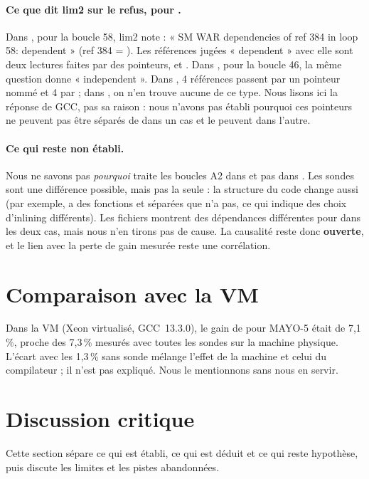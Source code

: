 \paragraph{Ce que dit lim2 sur le refus, pour .} \F{} Dans , pour la boucle 58, lim2 note : « SM WAR dependencies of ref 384 in loop 58: dependent » (ref 384 = ). Les références jugées « dependent » avec elle sont deux lectures  faites par des pointeurs,  et . Dans , pour la boucle 46, la même question donne « independent ». Dans , 4 références passent par un pointeur nommé  et 4 par ; dans , on n'en trouve aucune de ce type. Nous lisons ici la réponse de GCC, pas sa raison : nous n'avons pas établi pourquoi ces pointeurs ne peuvent pas être séparés de  dans un cas et le peuvent dans l'autre.

\paragraph{Ce qui reste non établi.} Nous ne savons pas \emph{pourquoi}  traite les boucles A2 dans  et pas dans . Les sondes sont une différence possible, mais pas la seule : la structure du code change aussi (par exemple,  a des fonctions  et  séparées que  n'a pas, ce qui indique des choix d'inlining différents). Les fichiers montrent des dépendances différentes pour  dans les deux cas, mais nous n'en tirons pas de cause. La causalité reste donc \textbf{ouverte}, et le lien avec la perte de gain mesurée reste une corrélation.

\section{Comparaison avec la VM}
\F{} Dans la VM (Xeon virtualisé, GCC~13.3.0), le gain de  pour MAYO-5 était de 7,1\,\%, proche des 7,3\,\% mesurés avec toutes les sondes sur la machine physique. \Hy{} L'écart avec les 1,3\,\% sans sonde mélange l'effet de la machine et celui du compilateur ; il n'est pas expliqué. Nous le mentionnons sans nous en servir.

\section{Discussion critique}\label{sec:discussion}
Cette section sépare ce qui est établi, ce qui est déduit et ce qui reste hypothèse, puis discute les limites et les pistes abandonnées.

